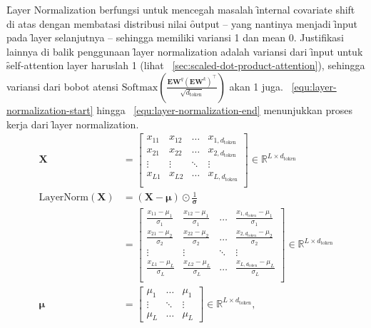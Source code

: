 	\f{Layer Normalization} berfungsi untuk mencegah masalah \f{internal covariate shift} di atas dengan membatasi distribusi nilai \f{output} -- yang nantinya menjadi \f{input} pada \f{layer} selanjutnya -- sehingga memiliki variansi 1 dan mean 0. Justifikasi lainnya di balik penggunaan \f{layer normalization} adalah variansi dari \f{input} untuk \f{self-attention layer} haruslah 1 (lihat \sect~\ref{sec:scaled-dot-product-attention}), sehingga variansi dari bobot atensi $\text{Softmax}(\frac{\mathbf{EW}^q (\mathbf{EW}^k)^{\top}}{\sqrt{d_{\text{token}}}})$ akan 1 juga. \equ~\ref{equ:layer-normalization-start} hingga \equ~\ref{equ:layer-normalization-end} menunjukkan proses kerja dari \f{layer normalization}.
	\begin{align}
		\label{equ:layer-normalization-start}
		\mathbf{X} &= \begin{bmatrix}
			x_{11} & x_{12} & \dots & x_{1,d_{\text{token}}} \\
		x_{21} & x_{22} & \dots & x_{2,d_{\text{token}}} \\
		\vdots & \vdots & \ddots & \vdots \\
		x_{L1} & x_{L2} & \dots & x_{L,d_{\text{token}}} \\
		\end{bmatrix} \in \mathbb{R}^{L \times d_{\text{token}}} \\
		\text{LayerNorm}(\mathbf{X}) &= (\mathbf{X}-\bm{\mu})\odot \frac{1}{\bm{\sigma}}\\
		&= \begin{bmatrix}
		\frac{x_{11}-\mu_1}{\sigma_1} & \frac{x_{12}-\mu_1}{\sigma_1} & \dots & \frac{x_{1,d_{\text{token}}}-\mu_1}{\sigma_1} \\
		\frac{x_{21}-\mu_2}{\sigma_2} & \frac{x_{22}-\mu_2}{\sigma_2} & \dots & \frac{x_{2,d_{\text{token}}}-\mu_2}{\sigma_2} \\
		\vdots & \vdots & \ddots & \vdots \\
		\frac{x_{L1}-\mu_L}{\sigma_L} & \frac{x_{L2}-\mu_L}{\sigma_L} & \dots & \frac{x_{L,d_{\text{token}}}-\mu_L}{\sigma_L} \\
		\end{bmatrix} \in \mathbb{R}^{L \times d_{\text{token}}} \\
		\bm{\mu} &= \begin{bmatrix}
		\mu_1 &\dots & \mu_1 \\
		\vdots & \ddots &\vdots \\
		\mu_L & \dots & \mu_L
		\end{bmatrix} \in \mathbb{R}^{L\times d_{\text{token}}}, \\

\end{align}
